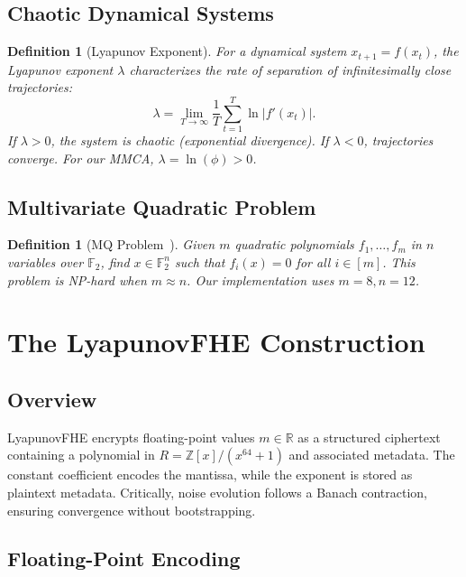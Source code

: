 \documentclass[11pt,a4paper]{article}
\newtheorem{definition}[theorem]{Definition}
\begin{document}
\subsection{Chaotic Dynamical Systems}

\begin{definition}[Lyapunov Exponent]
\label{def:lyapunov}
For a dynamical system $x_{t+1} = f(x_t)$, the Lyapunov exponent $\lambda$ characterizes the rate of separation of infinitesimally close trajectories:
\[
\lambda = \lim_{T \to \infty} \frac{1}{T} \sum_{t=1}^{T} \ln|f'(x_t)|.
\]
If $\lambda > 0$, the system is chaotic (exponential divergence). If $\lambda < 0$, trajectories converge. For our MMCA, $\lambda = \ln(\phi) > 0$.
\end{definition}

\subsection{Multivariate Quadratic Problem}

\begin{definition}[MQ Problem~\cite{patarin1996}]
\label{def:mq}
Given $m$ quadratic polynomials $f_1, \ldots, f_m$ in $n$ variables over $\mathbb{F}_2$, find $x \in \mathbb{F}_2^n$ such that $f_i(x) = 0$ for all $i \in [m]$. This problem is NP-hard when $m \approx n$. Our implementation uses $m=8, n=12$.
\end{definition}

\newpage

\section{The LyapunovFHE Construction}
\label{sec:construction}

\subsection{Overview}

LyapunovFHE encrypts floating-point values $m \in \mathbb{R}$ as a structured ciphertext containing a polynomial in $R = \mathbb{Z}[x]/(x^{64}+1)$ and associated metadata. The constant coefficient encodes the mantissa, while the exponent is stored as plaintext metadata. Critically, noise evolution follows a Banach contraction, ensuring convergence without bootstrapping.

\subsection{Floating-Point Encoding}
\end{document}
